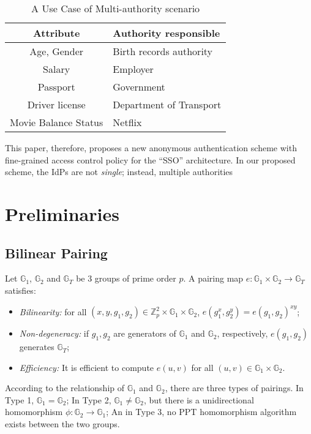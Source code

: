 \documentclass[journal]{IEEEtran}
\begin{document}
\begin{table}[t]
	\caption{A Use Case of Multi-authority scenario}\label{table:usecase}
	\centering
	\begin{tabular}{c|l}
		\hline
		Attribute & Authority responsible\\
		\hline
		Age, Gender & Birth records authority\\
		Salary & Employer\\
		Passport & Government\\
		Driver license & Department of Transport\\
		Movie Balance Status & Netflix\\
		\hline
	\end{tabular}
\end{table}

This paper, therefore, proposes a new anonymous authentication scheme with fine-grained access control policy for the ``SSO'' architecture. In our proposed scheme, the IdPs are not \textit{single}; instead, multiple authorities 

\section{Preliminaries}
\subsection{Bilinear Pairing}
Let $\mathbb{G}_1$, $\mathbb{G}_2$ and $\mathbb{G}_T$ be 3 groups of prime order $p$. A pairing map $e:\mathbb{G}_1\times \mathbb{G}_2\rightarrow\mathbb{G}_T$ satisfies:
\begin{itemize}
	\item \textit{Bilinearity:} for all $(x,y, g_1, g_2) \in \mathbb{Z}_p^2\times \mathbb{G}_1\times \mathbb{G}_2$, $e(g_1^x, g_2^y) = e(g_1, g_2)^{xy}$;
	\item \textit{Non-degeneracy:} if $g_1, g_2$ are generators of $\mathbb{G}_1$ and $\mathbb{G}_2$, respectively, $e(g_1, g_2)$ generates $\mathbb{G}_T$;
	\item \textit{Efficiency:} It is efficient to compute $e(u,v)$ for all $(u, v) \in \mathbb{G}_1\times \mathbb{G}_2$.
\end{itemize}

According to the relationship of $\mathbb{G}_1$ and $\mathbb{G}_2$, there are three types of pairings. 
In Type 1, $\mathbb{G}_1 = \mathbb{G}_2$; In Type 2, $\mathbb{G}_1 \neq \mathbb{G}_2$, but there is a unidirectional homomorphism $\phi:\mathbb{G}_2 \rightarrow \mathbb{G}_1$; An in Type 3, no PPT homomorphism algorithm exists between the two groups.
\end{document}
